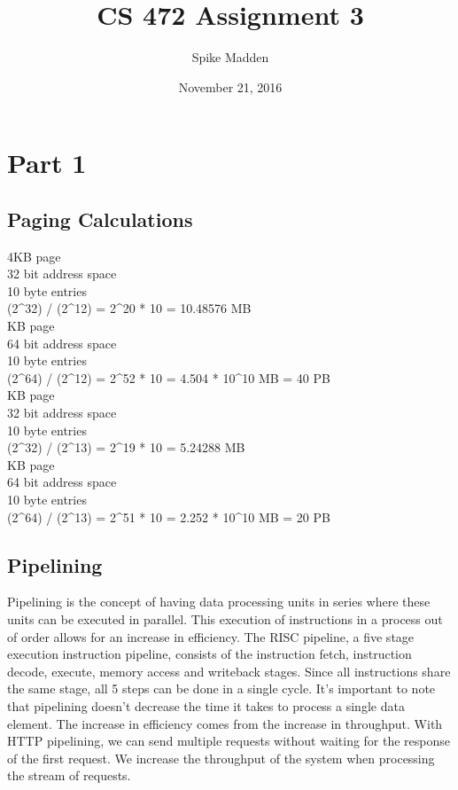 \documentclass[letterpaper,10pt,titlepage]{article}
\title{CS 472 Assignment 3}
\author{Spike Madden}
\date{November 21, 2016}
\begin{document}
\maketitle
\pagebreak

\section*{Part 1}
\subsection*{Paging Calculations}
4KB page \\
32 bit address space \\
10 byte entries \\

\noindent(2\^{}32) / (2\^{}12) = 2\^{}20 * 10 = 10.48576 MB \\

 KB page \\
64 bit address space \\
10 byte entries \\

\noindent(2\^{}64) / (2\^{}12) = 2\^{}52 * 10 = 4.504 * 10\^{}10 MB = 40 PB \\

 KB page \\
32 bit address space \\
10 byte entries \\

\noindent(2\^{}32) / (2\^{}13) = 2\^{}19 * 10 = 5.24288 MB \\

 KB page \\
64 bit address space \\
10 byte entries \\

\noindent(2\^{}64) / (2\^{}13) = 2\^{}51 * 10 = 2.252 * 10\^{}10 MB = 20 PB \\

\subsection*{Pipelining}
Pipelining is the concept of having data processing units in series where these units can be executed in parallel. This execution of instructions in a process out of order allows for an increase in efficiency. The RISC pipeline, a five stage execution instruction pipeline, consists of the instruction fetch, instruction decode, execute, memory access and writeback stages. Since all instructions share the same stage,  all 5 steps can be done in a single cycle. It's important to note that pipelining doesn't decrease the time it takes to process a single data element. The increase in efficiency comes from the increase in throughput. With HTTP pipelining, we can send multiple requests without waiting for the response of the first request. We increase the throughput of the system when processing the stream of requests.
\end{document}
